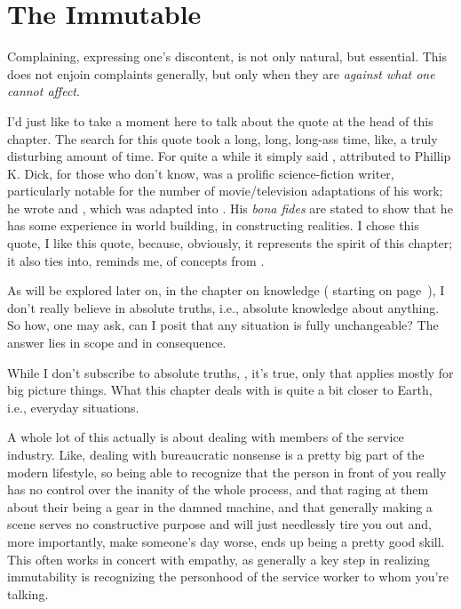 \documentclass[../butidigress.tex]{subfiles}
\begin{document}
\chapter{The Immutable}\label{chap:immutable}
\newpage
{}
Complaining, expressing one's discontent, is not only natural, but essential.
This does not enjoin complaints generally, but only when they are \emph{against what one cannot affect}.

I'd just like to take a moment here to talk about the quote at the head of this chapter.
The search for this quote took a long, long, long-ass time, like, a truly disturbing amount of time.
For quite a while it simply said , attributed to 
Phillip K. Dick, for those who don't know, was a prolific science-fiction writer, particularly notable for the number of movie/television adaptations of his work; he wrote  and , which was adapted into .
His \textit{bona fides} are stated to show that he has some experience in world building, in constructing realities.
I chose this quote, I like this quote, because, obviously, it represents the spirit of this chapter; it also ties into, reminds me, of concepts from .

As will be explored later on, in the chapter on knowledge ( starting on page~\pageref{chap:knowledge}), I don't really believe in absolute truths, i.e., absolute knowledge about anything.
So how, one may ask, can I posit that any situation is fully unchangeable?
The answer lies in scope and in consequence.

While I don't subscribe to absolute truths, , it's true, only  that applies mostly for big picture things.
What this chapter deals with is quite a bit closer to Earth, i.e., everyday situations.

A whole lot of this actually is about dealing with members of the service industry.
Like, dealing with bureaucratic nonsense is a pretty big part of the modern lifestyle, so being able to recognize that the person in front of you really has no control over the inanity of the whole process, and that raging at them about their being a gear in the damned machine, and that generally making a scene serves no constructive purpose and will just needlessly tire you out and, more importantly, make someone's day worse, ends up being a pretty good skill.
This often works in concert with empathy, as generally a key step in realizing immutability is recognizing the personhood of the service worker to whom you're talking.
\end{document}
